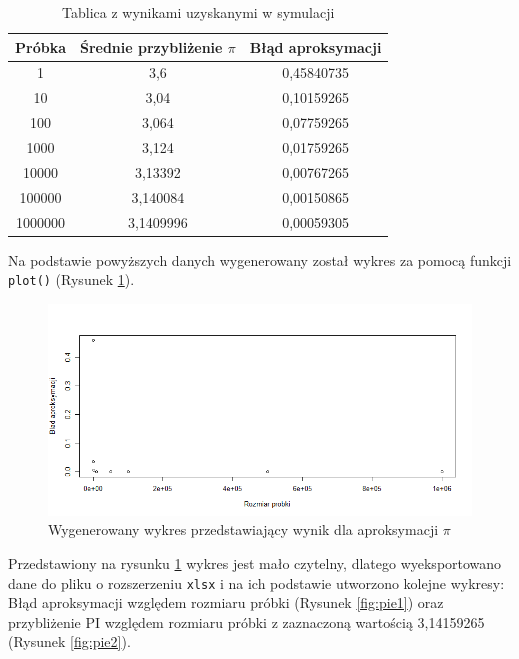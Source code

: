 \documentclass[a4paper,11pt,titlepage]{article}
\begin{document}
\begin{table}[h!]
\centering
\begin{tabular}{ |c|c|c| } 
 \hline
 Próbka & Średnie przybliżenie $\pi$ & Błąd aproksymacji \\
 \hline
 1	& 3,6 &	0,45840735 \\
 10	& 3,04 &	0,10159265 \\
 100	& 	3,064 &	0,07759265 \\
 1000	& 3,124 &	0,01759265 \\
 10000	& 3,13392 &	0,00767265 \\
 100000	& 	3,140084 &	0,00150865 \\
 1000000	& 3,1409996 &	0,00059305 \\
 \hline
\end{tabular}
\caption{Tablica z wynikami uzyskanymi w symulacji}
\label{tab:res}
\end{table}

Na podstawie powyższych danych wygenerowany został wykres za pomocą funkcji \verb|plot()| (Rysunek \ref{fig:pi10}). 

\begin{figure}[H]
\centering
\includegraphics[width=1\columnwidth]{img/pi10.PNG}
\caption{Wygenerowany wykres przedstawiający wynik dla aproksymacji $\pi$}
\label{fig:pi10}
\end{figure}

Przedstawiony na rysunku \ref{fig:pi10} wykres jest mało czytelny, dlatego wyeksportowano dane do pliku o rozszerzeniu \verb|xlsx| i na ich podstawie utworzono kolejne wykresy: Błąd aproksymacji względem rozmiaru próbki (Rysunek \ref{fig:pie1}) oraz przybliżenie PI względem rozmiaru próbki z zaznaczoną wartością 3,14159265 (Rysunek \ref{fig:pie2}).
\end{document}
